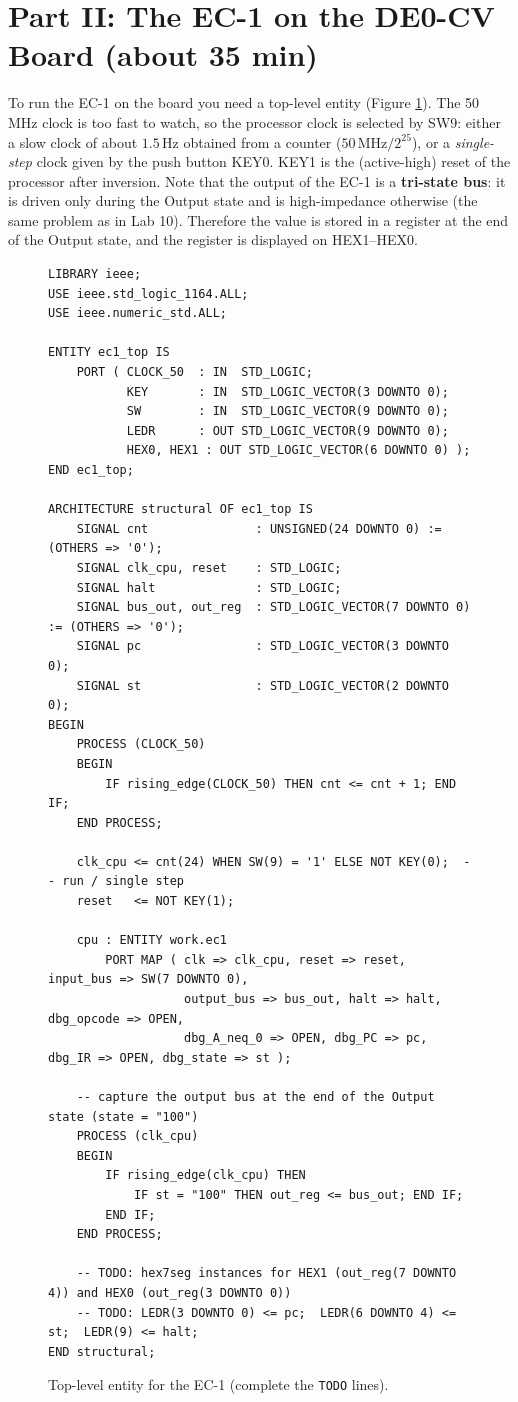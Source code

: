 \documentclass{article}
\begin{document}
\section*{Part II: The EC-1 on the DE0-CV Board (about 35 min)}

To run the EC-1 on the board you need a top-level entity (Figure \ref{fig:ec1_top}). The 50 MHz clock is too fast to watch, so the processor clock is selected by SW9: either a slow clock of about $1.5\,\mathrm{Hz}$ obtained from a counter ($50\,\mathrm{MHz}/2^{25}$), or a \emph{single-step} clock given by the push button KEY0. KEY1 is the (active-high) reset of the processor after inversion. Note that the output of the EC-1 is a \textbf{tri-state bus}: it is driven only during the Output state and is high-impedance otherwise (the same problem as in Lab 10). Therefore the value is stored in a register at the end of the Output state, and the register is displayed on HEX1--HEX0.

\begin{figure}[H]
    \centering
    \begin{verbatim}
LIBRARY ieee;
USE ieee.std_logic_1164.ALL;
USE ieee.numeric_std.ALL;

ENTITY ec1_top IS
    PORT ( CLOCK_50  : IN  STD_LOGIC;
           KEY       : IN  STD_LOGIC_VECTOR(3 DOWNTO 0);
           SW        : IN  STD_LOGIC_VECTOR(9 DOWNTO 0);
           LEDR      : OUT STD_LOGIC_VECTOR(9 DOWNTO 0);
           HEX0, HEX1 : OUT STD_LOGIC_VECTOR(6 DOWNTO 0) );
END ec1_top;

ARCHITECTURE structural OF ec1_top IS
    SIGNAL cnt               : UNSIGNED(24 DOWNTO 0) := (OTHERS => '0');
    SIGNAL clk_cpu, reset    : STD_LOGIC;
    SIGNAL halt              : STD_LOGIC;
    SIGNAL bus_out, out_reg  : STD_LOGIC_VECTOR(7 DOWNTO 0) := (OTHERS => '0');
    SIGNAL pc                : STD_LOGIC_VECTOR(3 DOWNTO 0);
    SIGNAL st                : STD_LOGIC_VECTOR(2 DOWNTO 0);
BEGIN
    PROCESS (CLOCK_50)
    BEGIN
        IF rising_edge(CLOCK_50) THEN cnt <= cnt + 1; END IF;
    END PROCESS;

    clk_cpu <= cnt(24) WHEN SW(9) = '1' ELSE NOT KEY(0);  -- run / single step
    reset   <= NOT KEY(1);

    cpu : ENTITY work.ec1
        PORT MAP ( clk => clk_cpu, reset => reset, input_bus => SW(7 DOWNTO 0),
                   output_bus => bus_out, halt => halt, dbg_opcode => OPEN,
                   dbg_A_neq_0 => OPEN, dbg_PC => pc, dbg_IR => OPEN, dbg_state => st );

    -- capture the output bus at the end of the Output state (state = "100")
    PROCESS (clk_cpu)
    BEGIN
        IF rising_edge(clk_cpu) THEN
            IF st = "100" THEN out_reg <= bus_out; END IF;
        END IF;
    END PROCESS;

    -- TODO: hex7seg instances for HEX1 (out_reg(7 DOWNTO 4)) and HEX0 (out_reg(3 DOWNTO 0))
    -- TODO: LEDR(3 DOWNTO 0) <= pc;  LEDR(6 DOWNTO 4) <= st;  LEDR(9) <= halt;
END structural;
    \end{verbatim}
    \caption{Top-level entity for the EC-1 (complete the \texttt{TODO} lines).}
    \label{fig:ec1_top}
\end{figure}
\end{document}
